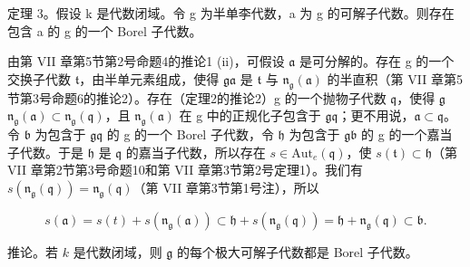 定理 3。假设 k 是代数闭域。令 g 为半单李代数，a 为 g 的可解子代数。则存在包含 a 的 g 的一个 Borel 子代数。

由第 VII 章第5节第2号命题4的推论1 (ii)，可假设 \(\mathfrak{a}\) 是可分解的。存在 g 的一个交换子代数 \(\mathfrak{t}\)，由半单元素组成，使得 \(\mathfrak{g}\)\(\mathfrak{a}\) 是 \(\mathfrak{t}\) 与 \(\mathfrak{n}_{\mathfrak{g}}(\mathfrak{a})\) 的半直积（第 VII 章第5节第3号命题6的推论2）。存在（定理2的推论2）g 的一个抛物子代数 \(\mathfrak{q}\)，使得 \(\mathfrak{g}\)\(\mathfrak{n}_{\mathfrak{g}}(\mathfrak{a}) \subset \mathfrak{n}_{\mathfrak{g}}(\mathfrak{q})\)，且 \(\mathfrak{n}_{\mathfrak{g}}(\mathfrak{a})\) 在 g 中的正规化子包含于 \(\mathfrak{g}\)\(\mathfrak{q}\)；更不用说，\(\mathfrak{a} \subset \mathfrak{q}\)。令 \(\mathfrak{b}\) 为包含于 \(\mathfrak{g}\)\(\mathfrak{q}\) 的 g 的一个 Borel 子代数，令 \(\mathfrak{h}\) 为包含于 \(\mathfrak{g}\)\(\mathfrak{b}\) 的 g 的一个嘉当子代数。于是 \(\mathfrak{h}\) 是 \(\mathfrak{q}\) 的嘉当子代数，所以存在 \(s \in \mathrm{Aut}_e(\mathfrak{q})\)，使 \(s(\mathfrak{t}) \subset \mathfrak{h}\)（第 VII 章第2节第3号命题10和第 VII 章第3节第2号定理1）。我们有 \(s(\mathfrak{n}_{\mathfrak{g}}(\mathfrak{q})) = \mathfrak{n}_{\mathfrak{g}}(\mathfrak{q})\)（第 VII 章第3节第1号注），所以

\[
s (\mathfrak {a}) = s (t) + s \left(\mathfrak {n} _ {\mathfrak {g}} (\mathfrak {a})\right) \subset \mathfrak {h} + s \left(\mathfrak {n} _ {\mathfrak {g}} (\mathfrak {q})\right) = \mathfrak {h} + \mathfrak {n} _ {\mathfrak {g}} (\mathfrak {q}) \subset \mathfrak {b}.
\]

推论。若 \(k\) 是代数闭域，则 \(\mathfrak{g}\) 的每个极大可解子代数都是 Borel 子代数。

